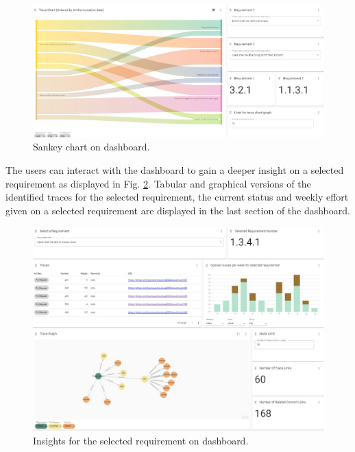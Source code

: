 \begin{figure}[htb]
    \centering
    \includegraphics[width=.9\linewidth]{figs/sankey.jpg}
    \caption{Sankey chart on dashboard.}
    \label{fig:sankey}
\end{figure}

The users can interact with the dashboard to gain a deeper insight on a selected requirement as displayed in Fig. \ref{fig:perreq}. Tabular and graphical versions of the identified traces for the selected requirement, the current status and weekly effort given on a selected requirement are displayed in the last section of the dashboard.

\begin{figure}[htb]
    \centering
    \includegraphics[width=.9\linewidth]{figs/perreq.jpg}
    \caption{Insights for the selected requirement on dashboard.}
    \label{fig:perreq}
\end{figure}

